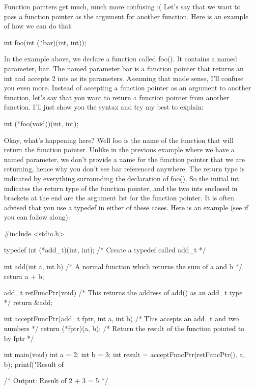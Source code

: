 \documentclass{article}
\begin{document}
Function pointers get much, much more confusing :( Let’s say that we want to pass a function pointer as the
argument for another function. Here is an example of how we can do that:

\begin{cblk}
int foo(int (*bar)(int, int));
\end{cblk}

In the example above, we declare a function called foo(). It contains a named parameter, bar. The named
parameter bar is a function pointer that returns an int and accepts 2 ints as its parameters. Assuming that
made sense, I’ll confuse you even more. Instead of accepting a function pointer as an argument to another
function, let’s say that you want to return a function pointer from another function. I’ll just show you the
syntax and try my best to explain:

\begin{cblk}
int (*foo(void))(int, int);
\end{cblk}

Okay, what’s happening here? Well foo is the name of the function that will return the function pointer.
Unlike in the previous example where we have a named parameter, we don’t provide a name for the function
pointer that we are returning, hence why you don’t see bar referenced anywhere. The return type is indicated
by everything surrounding the declaration of foo(). So the initial int indicates the return type of the
function pointer, and the two ints enclosed in brackets at the end are the argument list for the function
pointer. It is often advised that you use a typedef in either of these cases. Here is an example (see if you
can follow along):

\begin{cblk}
#include <stdio.h>

typedef int (*add_t)(int, int); /* Create a typedef called add_t */

int add(int a, int b) { /* A normal function which returns the sum of a and b */
   return a + b;
}

add_t retFuncPtr(void) { /* This returns the address of add() as an add_t type */
   return &add;
}

int acceptFuncPtr(add_t fptr, int a, int b) { /* This accepts an add_t and two numbers */
   return (*fptr)(a, b); /* Return the result of the function pointed to by fptr */
}

int main(void) {
   int a = 2;
   int b = 3;
   int result = acceptFuncPtr(retFuncPtr(), a, b);
   printf("Result of %
}

/* Output: Result of 2 + 3 = 5 */
\end{cblk}
\end{document}
